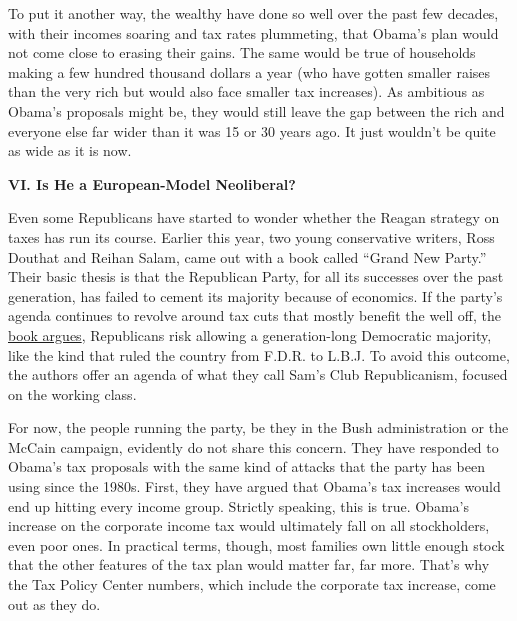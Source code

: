 To put it another way, the wealthy have done so well over the past few
decades, with their incomes soaring and tax rates plummeting, that
Obama's plan would not come close to erasing their gains. The same would
be true of households making a few hundred thousand dollars a year (who
have gotten smaller raises than the very rich but would also face
smaller tax increases). As ambitious as Obama's proposals might be, they
would still leave the gap between the rich and everyone else far wider
than it was 15 or 30 years ago. It just wouldn't be quite as wide as it
is now.

\textbf{VI. Is He a European-Model Neoliberal?}

Even some Republicans have started to wonder whether the Reagan strategy
on taxes has run its course. Earlier this year, two young conservative
writers, Ross Douthat and Reihan Salam, came out with a book called
``Grand New Party.'' Their basic thesis is that the Republican Party,
for all its successes over the past generation, has failed to cement its
majority because of economics. If the party's agenda continues to
revolve around tax cuts that mostly benefit the well off, the
\href{http://www.nytimes.com/2008/06/29/books/review/Ornstein-t.html}{book
argues}, Republicans risk allowing a generation-long Democratic
majority, like the kind that ruled the country from F.D.R. to L.B.J. To
avoid this outcome, the authors offer an agenda of what they call Sam's
Club Republicanism, focused on the working class.

For now, the people running the party, be they in the Bush
administration or the McCain campaign, evidently do not share this
concern. They have responded to Obama's tax proposals with the same kind
of attacks that the party has been using since the 1980s. First, they
have argued that Obama's tax increases would end up hitting every income
group. Strictly speaking, this is true. Obama's increase on the
corporate income tax would ultimately fall on all stockholders, even
poor ones. In practical terms, though, most families own little enough
stock that the other features of the tax plan would matter far, far
more. That's why the Tax Policy Center numbers, which include the
corporate tax increase, come out as they do.

